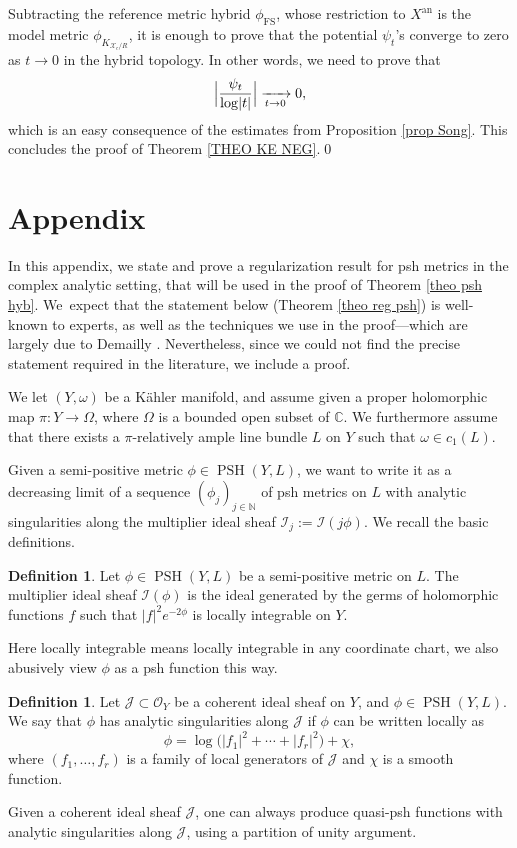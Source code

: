 \documentclass[JEP,XML,SOM,Unicode,published]{cedram}
\theoremstyle{definition}
\newtheorem{defn}[equation]{Definition}
\newcommand \C{\mathbb C}
\newcommand \N{\mathbb N}
\newcommand \gO {\mathcal O}
\newcommand \X {\mathscr{X}}
\newcommand{\an}{\mathrm{an}}
\DeclareMathOperator{\FS}{FS}
\DeclareMathOperator{\PSH}{PSH}
\begin{document}
Subtracting the reference metric hybrid $\phi_{\FS}$, whose restriction to $X^{\an}$ is the model metric $\phi_{K_{\X_c/R}}$, it is enough to prove that the potential $\psi_t$'s converge to zero as $t \to 0$ in the hybrid topology. In other words, we need to prove that
\[
\Bigl\lvert \frac{\psi_t}{\log \lvert t \rvert} \Bigr\rvert \xrightarrow[t \to 0]{} 0,
\]
which is an easy consequence of the estimates from Proposition \ref{prop Song}. This concludes the proof of Theorem \ref{THEO KE NEG}.\qed

\appendix
{}
\section*{Appendix} \label{appendix psh}
In this appendix, we state and prove a regularization result for psh metrics in the complex analytic setting, that will be used in the proof of Theorem \ref{theo psh hyb}. We~expect that the statement below (Theorem \ref{theo reg psh}) is well-known to experts, as well as the techniques we use in the proof---which are largely due to Demailly \cite{Dem}. Nevertheless, since we could not find the precise statement required in the literature, we include a proof.

We let $(Y, \omega)$ be a Kähler manifold, and assume given a proper holomorphic map $\pi: Y \to \Omega$, where $\Omega$ is a bounded open subset of $\C$. We furthermore assume that there exists a $\pi$-relatively ample line bundle $L$ on $Y$ such that $\omega \in c_1(L)$.

Given a semi-positive metric $\phi \in \PSH(Y,L)$, we want to write it as a decreasing limit of a sequence $(\phi_j)_{j \in \N}$ of psh metrics on $L$ with analytic singularities along the multiplier ideal sheaf $\mathscr{I}_j:= \mathscr{I}(j \phi)$. We recall the basic definitions.
\begin{defn} Let $\phi \in \PSH(Y, L)$ be a semi-positive metric on $L$. The multiplier ideal sheaf $\mathscr{I}(\phi)$ is the ideal generated by the germs of holomorphic functions $f$ such that $\lvert f \rvert^2 e^{-2\phi}$ is locally integrable on $Y$.
\end{defn}
Here locally integrable means locally integrable in any coordinate chart, we also abusively view $\phi$ as a psh function this way.
\begin{defn} \label{def ansing} Let $\mathscr{J} \subset \gO_Y$ be a coherent ideal sheaf on $Y$, and $\phi \in \PSH(Y, L)$. We say that $\phi$ has analytic singularities along $\mathscr{J}$ if $\phi$ can be written locally as
\[
\phi = \log \bigl(\lvert f_1 \rvert^2 +\cdots+ \lvert f_r \rvert^2 \bigr) + \chi,
\]
where $(f_1,\dots,f_r)$ is a family of local generators of $\mathscr{J}$ and $\chi$ is a smooth function.
\end{defn}
Given a coherent ideal sheaf $\mathscr{J}$, one can always produce quasi-psh functions with analytic singularities along $\mathscr{J}$, using a partition of unity argument.
\end{document}
